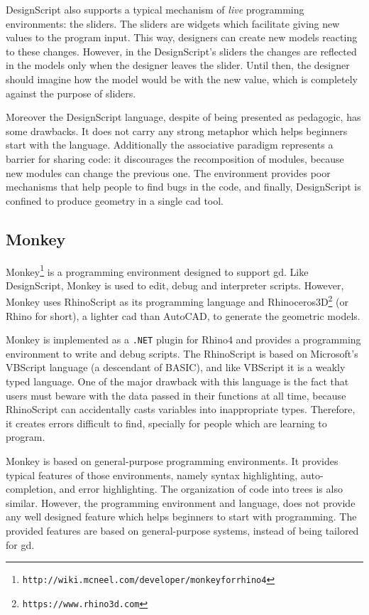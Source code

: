DesignScript also supports a typical mechanism of \textit{live} programming environments: the sliders. The sliders are widgets which facilitate giving new values to the program input. This way, designers can create new models reacting to these changes. However, in the DesignScript's sliders the changes are reflected in the models only when the designer leaves the slider. Until then, the designer should imagine how the model would be with the new value, which is completely against the purpose of sliders.

Moreover the DesignScript language, despite of being presented as pedagogic, has some drawbacks. It does not carry any strong metaphor which helps beginners start with the language. Additionally the associative paradigm represents a barrier for sharing code: it discourages the recomposition of modules, because new modules can change the previous one. The environment provides poor mechanisms that help people to find bugs in the code, and finally,  DesignScript is confined to produce geometry in a single \gls{cad} tool.
\subsection{Monkey} 
\label{subsec:monkey}
Monkey\footnote{\texttt{http://wiki.mcneel.com/developer/monkeyforrhino4}} is a programming environment designed to support \gls{gd}. Like DesignScript, Monkey is used to edit, debug and interpreter scripts. However, Monkey uses RhinoScript as its programming language and Rhinoceros3D\footnote{\label{fnote:rhin}\texttt{https://www.rhino3d.com}} (or Rhino for short), a lighter \gls{cad} than AutoCAD, to generate the geometric models.

Monkey is implemented as a \texttt{.NET} plugin for Rhino4 and provides a programming environment to write and debug scripts. The RhinoScript is based on Microsoft's VBScript language (a descendant of BASIC), and like VBScript it is a weakly typed language. One of the major drawback with this language is the fact that users must beware with the data passed in their functions at all time, because RhinoScript can accidentally casts variables into inappropriate types. Therefore, it creates errors difficult to find, specially for people which are learning to program.

Monkey is based on general-purpose programming environments. It provides typical features of those environments, namely syntax highlighting, auto-completion, and error highlighting. The organization of code into trees is also similar. However, the programming environment and language, does not provide any well designed feature which helps beginners to start with programming. The provided features are based on general-purpose systems, instead of being tailored for \gls{gd}.
